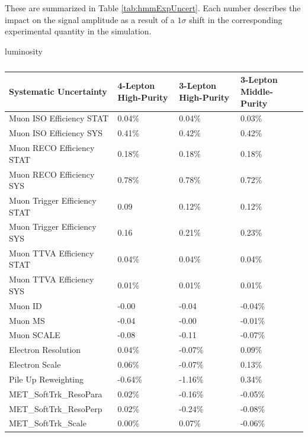 These are summarized in Table \ref{tab:hmmExpUncert}.
Each number describes the impact on the signal amplitude as a result of a $1\sigma$ shift in the corresponding experimental quantity in the simulation.

{\color{red} luminosity}

\begin{table}[htp]
\begin{center}
\begin{tabular}{l l l l}
\toprule
Systematic Uncertainty   & 4-Lepton High-Purity   & 3-Lepton High-Purity  & 3-Lepton Middle-Purity   \\
\midrule
 Muon ISO Efficiency STAT   & 0.04\%   & 0.04\%   & 0.03\%   \\
 Muon ISO Efficiency SYS   & 0.41\%   & 0.42\%   & 0.42\%   \\
 Muon RECO Efficiency STAT   & 0.18\%   & 0.18\%   & 0.18\%   \\
 Muon RECO Efficiency SYS   & 0.78\%   & 0.78\%   & 0.72\%   \\
 Muon Trigger Efficiency STAT   & 0.09    & 0.12\%   & 0.12\%   \\
 Muon Trigger Efficiency SYS   & 0.16    & 0.21\%   & 0.23\%   \\
 Muon TTVA Efficiency STAT   & 0.04\%   & 0.04\%   & 0.04\%   \\
 Muon TTVA Efficiency SYS   & 0.01\%   & 0.01\%   & 0.01\%   \\
 Muon ID   & -0.00    & -0.04    & -0.04\%   \\
 Muon MS   & -0.04    & -0.00    & -0.01\%   \\
 Muon SCALE   & -0.08    & -0.11    & -0.07\%   \\
 \midrule
 Electron Resolution   & 0.04\%   & -0.07\%   & 0.09\%   \\
 Electron Scale   & 0.06\%   & -0.07\%   & 0.13\%   \\
 \midrule
 Pile Up Reweighting   & -0.64\%   & -1.16\%   & 0.34\%   \\
 \midrule
 MET\_SoftTrk\_ResoPara   & 0.02\%   & -0.16\%   & -0.05\%   \\
 MET\_SoftTrk\_ResoPerp   & 0.02\%   & -0.24\%   & -0.08\%   \\
 MET\_SoftTrk\_Scale   & 0.00\%   & 0.07\%   & -0.06\%   \\
 \midrule
\bottomrule
\end{tabular}
\caption{}
\label{tab:}
\end{center}
\end{table}


